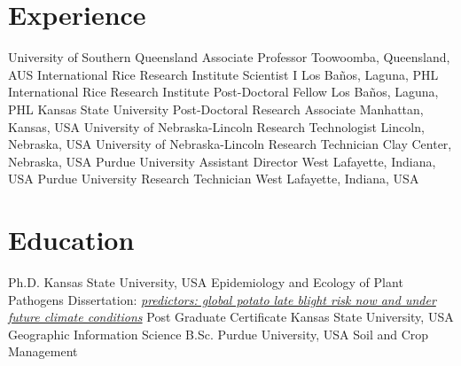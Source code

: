 \section*{Experience}
\begin{entrylist}
    {University of Southern Queensland}
    {Associate Professor}
    {Toowoomba, Queensland, AUS}
    {International Rice Research Institute}
    {Scientist I}
    {Los Ba\~nos, Laguna, PHL}
    {International Rice Research Institute}
    {Post-Doctoral Fellow}
    {Los Ba\~nos, Laguna, PHL}
    {Kansas State University}
    {Post-Doctoral Research Associate}
    {Manhattan, Kansas, USA}
   {University of Nebraska-Lincoln}
   {Research Technologist}
   {Lincoln, Nebraska, USA}
   {University of Nebraska-Lincoln}
   {Research Technician}
   {Clay Center, Nebraska, USA}
   {Purdue University}
   {Assistant Director}
   {West Lafayette, Indiana, USA}
   {Purdue University}
   {Research Technician}
   {West Lafayette, Indiana, USA}
\end{entrylist}

\section*{Education}\begin{entrylist}
    {Ph.D. {}}
    {Kansas State University, USA}
    {Epidemiology and Ecology of Plant Pathogens}
  \entry{}
  {Dissertation: }
  {}
    {\emph{\href{https://krex.k-state.edu/dspace/handle/2097/2341?show=full}{predictors: global potato late blight risk now and under future climate conditions}}}
    {Post Graduate Certificate {}}
    {Kansas State University, USA}
    {Geographic Information Science}
    {B.Sc. {}}
    {Purdue University, USA}
    {Soil and Crop Management}
\end{entrylist}
